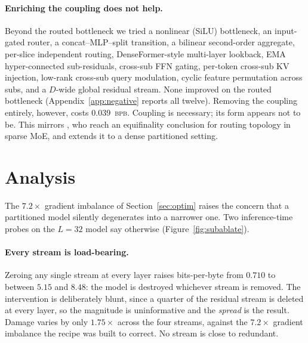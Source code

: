 \documentclass{article}
\newcommand{\bpb}{\textsc{bpb}}
\newcommand{\dmodel}{D}
\begin{document}
\paragraph{Enriching the coupling does not help.} Beyond the routed bottleneck we
tried a nonlinear (SiLU) bottleneck, an input-gated router, a concat--MLP--split
transition, a bilinear second-order aggregate, per-slice independent routing,
DenseFormer-style multi-layer lookback, EMA hyper-connected sub-residuals,
cross-sub FFN gating, per-token cross-sub KV injection, low-rank cross-sub query
modulation, cyclic feature permutation across subs, and a $\dmodel$-wide global
residual stream. None improved on the routed bottleneck
(Appendix~\ref{app:negative} reports all twelve). Removing the coupling entirely, however, costs
0.039~\bpb. Coupling is necessary; its form appears not to be. This mirrors
\citet{ternovtsii2026equifinality}, who reach an equifinality conclusion for
routing topology in sparse MoE, and extends it to a dense partitioned setting.



\section{Analysis}

The $7.2\times$ gradient imbalance of Section~\ref{sec:optim} raises the concern
that a partitioned model silently degenerates into a narrower one. Two
inference-time probes on the $L{=}32$ model say otherwise
(Figure~\ref{fig:subablate}).

\paragraph{Every stream is load-bearing.} Zeroing any single stream at every
layer raises bits-per-byte from $0.710$ to between $5.15$ and $8.48$: the model
is destroyed whichever stream is removed. The intervention is deliberately blunt,
since a quarter of the residual stream is deleted at every layer, so the
magnitude is uninformative and the \emph{spread} is the result. Damage varies by
only $1.75\times$ across the four streams, against the $7.2\times$ gradient
imbalance the recipe was built to correct. No stream is close to redundant.
\end{document}
